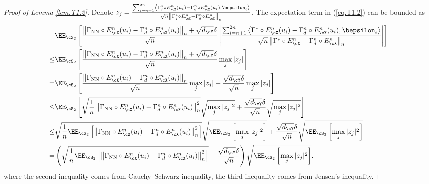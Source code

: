\documentclass[11pt]{article} %
\begin{document}
\begin{proof}[Proof of Lemma \ref{lem.T1.2}]
	Denote $z_j=\frac{\sum_{i=n+1}^{2n} \left\langle \Gamma_j^* \circ E_{\cX}^n(u_i)-\Gamma_{d}^n \circ E_{\cX}^n(u_i), \bepsilon_i\right\rangle}{\sqrt{n}\left\|\Gamma_j^* \circ E_{\cX}^n-\Gamma_{d}^n \circ E_{\cX}^n\right\|_n}$. The expectation term in (\ref{eq.T1.2}) can be bounded as
	\begin{align}
		&\EE_{\cS_2} \left[\frac{\left\|\Gamma_{\rm NN} \circ E_{\cX}^n(u_i)-\Gamma_{d}^n \circ E_{\cX}^n(u_i)\right\|_n+\sqrt{d_{\cY}}\delta}{\sqrt{n}} \left|\frac{\sum_{i=n+1}^{2n} \left\langle \Gamma^* \circ E_{\cX}^n(u_i)-\Gamma_{d}^n \circ E_{\cX}^n(u_i), \bepsilon_i\right\rangle}{\sqrt{n}\left\|\Gamma^* \circ E_{\cX}^n-\Gamma_{d}^n \circ E_{\cX}^n\right\|_n}\right|\right] \nonumber\\
		\leq & \EE_{\cS_2} \left[ \frac{\left\|\Gamma_{\rm NN} \circ E_{\cX}^n(u_i)-\Gamma_{d}^n \circ E_{\cX}^n(u_i)\right\|_n+\sqrt{d_{\cY}}\delta}{\sqrt{n}} \max_j |z_j|\right]\nonumber\\
		=& \EE_{\cS_2} \left[\frac{\left\|\Gamma_{\rm NN} \circ E_{\cX}^n(u_i)-\Gamma_{d}^n \circ E_{\cX}^n(u_i)\right\|_n}{\sqrt{n}}\max_j |z_j|+\frac{\sqrt{d_{\cY}}\delta}{\sqrt{n}} \max_j |z_j|\right]\nonumber\\
		\leq& \EE_{\cS_2}  \left[\sqrt{\frac{1}{n}\left\|\Gamma_{\rm NN} \circ E_{\cX}^n(u_i)-\Gamma_{d}^n \circ E_{\cX}^n(u_i)\right\|_n^2}\sqrt{\max_j |z_j|^2}+\frac{\sqrt{d_{\cY}}\delta}{\sqrt{n}} \sqrt{\max_j |z_j|^2}\right]\nonumber\\
		\leq & \sqrt{\frac{1}{n}\EE_{\cS_2}\left[\left\|\Gamma_{\rm NN} \circ E_{\cX}^n(u_i)-\Gamma_{d}^n \circ E_{\cX}^n(u_i)\right\|_n^2\right]}\sqrt{\EE_{\cS_2}\left[\max_j |z_j|^2\right]}+\frac{\sqrt{d_{\cY}}\delta}{\sqrt{n}} \sqrt{\EE_{\cS_2}\left[\max_j |z_j|^2\right]} \nonumber\\
		= & \left(\sqrt{\frac{1}{n}\EE_{\cS_2}\left[\left\|\Gamma_{\rm NN} \circ E_{\cX}^n(u_i)-\Gamma_{d}^n \circ E_{\cX}^n(u_i)\right\|_n^2\right]}+\frac{\sqrt{d_{\cY}}\delta}{\sqrt{n}} \right)\sqrt{\EE_{\cS_2}\left[\max_j |z_j|^2\right]}.
		\label{eq.T1.3}
	\end{align}
	where the second inequality comes from Cauchy--Schwarz inequality, the third inequality comes from Jensen's inequality.
	

\end{proof}
\end{document}
